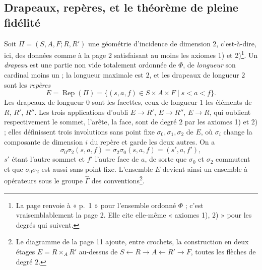 \documentclass[11pt,a4paper]{article}
\begin{document}
\subsection*{Drapeaux, repères, et le théorème de pleine fidélité}

Soit $\Pi = (S, A, F ; R, R')$ une géométrie d'incidence de dimension $2$,
c'est-à-dire, ici, des données comme à la page 2 satisfaisant au moins les
axiomes 1) et 2)\footnote{La page renvoie à « p.~1 » pour l'ensemble ordonné
$\Phi$ ; c'est vraisemblablement la page 2. Elle cite elle-même « axiomes 1),
2) » pour les degrés qui suivent.}. Un \emph{drapeau} est une partie non vide
totalement ordonnée de $\Phi$, de \emph{longueur} son cardinal moins un ; la
longueur maximale est $2$, et les drapeaux de longueur $2$ sont les
\emph{repères}
\[
E = \operatorname{Rep}(\Pi) = \{(s, a, f) \in S \times A \times F \mid s < a < f\}.
\]
Les drapeaux de longueur $0$ sont les facettes, ceux de longueur $1$ les
éléments de $R$, $R'$, $R''$. Les trois applications d'oubli
$E \to R'$, $E \to R''$, $E \to R$, qui oublient respectivement le sommet,
l'arête, la face, sont de degré $2$ par les axiomes 1) et 2) ; elles définissent
trois involutions sans point fixe $\sigma_0, \sigma_1, \sigma_2$ de $E$, où
$\sigma_i$ change la composante de dimension $i$ du repère et garde les deux
autres. On a
\[
\sigma_0\sigma_2(s, a, f) = \sigma_2\sigma_0(s, a, f) = (s', a, f'),
\]
$s'$ étant l'autre sommet et $f'$ l'autre face de $a$, de sorte que $\sigma_0$
et $\sigma_2$ commutent et que $\sigma_0\sigma_2$ est aussi sans point fixe.
L'ensemble $E$ devient ainsi un ensemble à opérateurs sous le groupe
$\widehat{\Gamma}$ des conventions\footnote{Le diagramme de la page 11 ajoute,
entre crochets, la construction en deux étages $E = R \times_A R'$
au-dessus de $S \leftarrow R \to A \leftarrow R' \to F$, toutes les flèches
de degré $2$.}.
\end{document}
